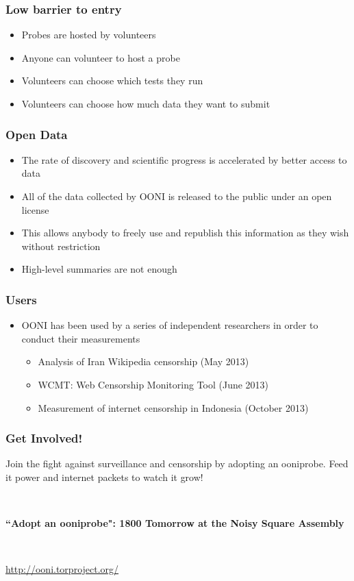 \documentclass{beamer}
\begin{document}
\begin{frame}
	\frametitle{Low barrier to entry}
	\begin{itemize}
		\item{Probes are hosted by volunteers}
		\item{Anyone can volunteer to host a probe}
		\item{Volunteers can choose which tests they run}
		\item{Volunteers can choose how much data they want to submit}
	\end{itemize}
\end{frame}

\begin{frame}
	\frametitle{Open Data}
	\begin{itemize}
		\item{The rate of discovery and scientific progress is accelerated by better access to data}
		\item{All of the data collected by OONI is released to the public under an open license}
		\item{This allows anybody to freely use and republish this information as they wish without restriction}
		\item{High-level summaries are not enough}
	\end{itemize}
\end{frame}

\begin{frame}
	\frametitle{Users}
	\begin{itemize}
		\item{OONI has been used by a series of independent researchers in order to conduct their measurements}
			\begin{itemize}
				\item{Analysis of Iran Wikipedia censorship (May 2013)}
				\item{WCMT: Web Censorship Monitoring Tool (June 2013)}
				\item{ Measurement of internet censorship in Indonesia (October 2013)}
			\end{itemize}
	\end{itemize}
\end{frame}

\begin{frame}
	\frametitle{Get Involved!}
	Join the fight against surveillance and censorship by adopting
	an ooniprobe. Feed it power and internet packets to watch it grow!

	\ 

	{\Large\bf ``Adopt an ooniprobe": 1800 Tomorrow at the Noisy Square Assembly}

	\ 

	\url{http://ooni.torproject.org/}
\end{frame}	
\end{document}
